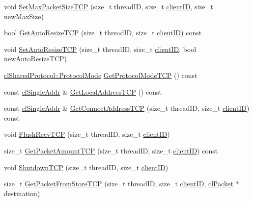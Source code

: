\begin{DoxyCompactItemize}
\item 
void \hyperlink{classcl_client_state_a20219c44a86cfaf56479a9ab2fc673ad}{SetMaxPacketSizeTCP} (size\_\-t threadID, size\_\-t \hyperlink{classcl_client_state_a4153db8a239f862cbd61bf8e75e25794}{clientID}, size\_\-t newMaxSize)
\item 
bool \hyperlink{classcl_client_state_ab209ee2149fe08f9c8c9ff559ce230e3}{GetAutoResizeTCP} (size\_\-t threadID, size\_\-t \hyperlink{classcl_client_state_a4153db8a239f862cbd61bf8e75e25794}{clientID}) const 
\item 
void \hyperlink{classcl_client_state_a33cd6903e101dfd02128a8a98bcbcb76}{SetAutoResizeTCP} (size\_\-t threadID, size\_\-t \hyperlink{classcl_client_state_a4153db8a239f862cbd61bf8e75e25794}{clientID}, bool newAutoResizeTCP)
\item 
\hyperlink{classcl_shared_protocol_a4b0b9c82b8ae4eee78c6308c35afd47b}{clSharedProtocol::ProtocolMode} \hyperlink{classcl_client_state_a886d8ef782d724132a514ba9d48ba03d}{GetProtocolModeTCP} () const 
\item 
const \hyperlink{classcl_single_addr}{clSingleAddr} \& \hyperlink{classcl_client_state_a906abc63036242a2b59bf4566fbb7663}{GetLocalAddressTCP} () const 
\item 
const \hyperlink{classcl_single_addr}{clSingleAddr} \& \hyperlink{classcl_client_state_aa7660aef340c674ef324e54f8f032968}{GetConnectAddressTCP} (size\_\-t threadID, size\_\-t \hyperlink{classcl_client_state_a4153db8a239f862cbd61bf8e75e25794}{clientID}) const 
\item 
void \hyperlink{classcl_client_state_a37f4fc080494f38943b43c5713846ff3}{FlushRecvTCP} (size\_\-t threadID, size\_\-t \hyperlink{classcl_client_state_a4153db8a239f862cbd61bf8e75e25794}{clientID})
\item 
size\_\-t \hyperlink{classcl_client_state_a1694f4da0940ca63a28deb5a5bb6fa1e}{GetPacketAmountTCP} (size\_\-t threadID, size\_\-t \hyperlink{classcl_client_state_a4153db8a239f862cbd61bf8e75e25794}{clientID}) const 
\item 
void \hyperlink{classcl_client_state_ab267f5f6408b8bd333557c262135210c}{ShutdownTCP} (size\_\-t threadID, size\_\-t \hyperlink{classcl_client_state_a4153db8a239f862cbd61bf8e75e25794}{clientID})
\item 
size\_\-t \hyperlink{classcl_client_state_a0da4458de7279931aa41c9b1850c70b3}{GetPacketFromStoreTCP} (size\_\-t threadID, size\_\-t \hyperlink{classcl_client_state_a4153db8a239f862cbd61bf8e75e25794}{clientID}, \hyperlink{classcl_packet}{clPacket} $\ast$destination)

\end{DoxyCompactItemize}
